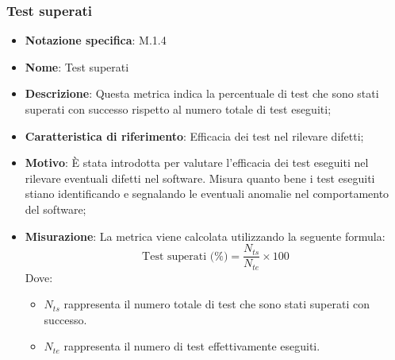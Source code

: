 \subsubsection{Test superati}
\begin{itemize}
    \item \textbf{Notazione specifica}: M.1.4
    \item \textbf{Nome}: Test superati
    \item \textbf{Descrizione}: Questa metrica indica la percentuale di test che sono stati superati con successo rispetto al numero totale di test eseguiti;
    \item \textbf{Caratteristica di riferimento}: Efficacia dei test nel rilevare difetti;
    \item \textbf{Motivo}: È stata introdotta per valutare l'efficacia dei test eseguiti nel rilevare eventuali difetti nel software. Misura quanto bene i test eseguiti stiano identificando e segnalando le eventuali anomalie nel comportamento del software;
    \item \textbf{Misurazione}: La metrica viene calcolata utilizzando la seguente formula:
    \[
    \text{Test superati (\%)} = \frac{N_{ts}}{N_{te}} \times 100
    \]
    Dove:
    \begin{itemize}
        \item $N_{ts}$ rappresenta il numero totale di test che sono stati superati con successo.
        \item $N_{te}$ rappresenta il numero di test effettivamente eseguiti.
    \end{itemize}

\end{itemize}
